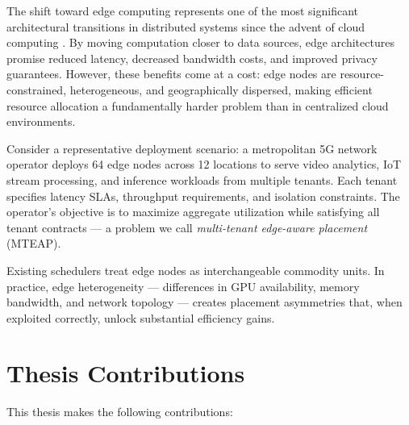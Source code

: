 \documentclass[12pt,letterpaper,twoside]{report}
\begin{document}
The shift toward edge computing represents one of the most significant architectural transitions in distributed systems since the advent of cloud computing \cite{talwar2019}. By moving computation closer to data sources, edge architectures promise reduced latency, decreased bandwidth costs, and improved privacy guarantees. However, these benefits come at a cost: edge nodes are resource-constrained, heterogeneous, and geographically dispersed, making efficient resource allocation a fundamentally harder problem than in centralized cloud environments.

Consider a representative deployment scenario: a metropolitan 5G network operator deploys 64 edge nodes across 12 locations to serve video analytics, IoT stream processing, and inference workloads from multiple tenants. Each tenant specifies latency SLAs, throughput requirements, and isolation constraints. The operator's objective is to maximize aggregate utilization while satisfying all tenant contracts --- a problem we call \textit{multi-tenant edge-aware placement} (MTEAP).

\begin{tcolorbox}[colback=uwaterlooGold!10,colframe=uwaterlooGold!60,title=\textbf{Key Insight}]
Existing schedulers treat edge nodes as interchangeable commodity units. In practice, edge heterogeneity --- differences in GPU availability, memory bandwidth, and network topology --- creates placement asymmetries that, when exploited correctly, unlock substantial efficiency gains.
\end{tcolorbox}

\section{Thesis Contributions}

This thesis makes the following contributions:
\end{document}
